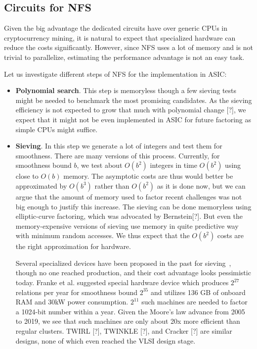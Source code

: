 \documentclass[a4paper]{article}
\begin{document}
 \subsection{Circuits for NFS}
 
 Given the big advantage the dedicated circuits have over generic CPUs in cryptocurrency mining, it is natural to expect that specialized hardware can reduce the costs significantly. However, since NFS uses a lot of memory and is not trivial to parallelize, estimating the performance advantage is not an easy task.
 
 Let us investigate different steps of NFS for the implementation in ASIC:
 \begin{itemize}
    \item \textbf{Polynomial search}.  This step is memoryless though a few sieving tests might be needed to benchmark the most promising candidates. As the sieving efficiency is not expected to grow that much with polynomial change [?], we expect that it might not be even implemented in ASIC for future factoring as simple CPUs might suffice.
 
     \item \textbf{Sieving}. In this step we generate a lot of integers and test them for smoothness.  There are many versions of this process. Currently, for smoothness bound $b$, we test about $O(b^2)$ integers in time $O(b^2)$ using close to $O(b)$ memory. The asymptotic costs are thus would better be approximated by $O(b^3)$ rather than $O(b^2)$ as it is done now, but we can argue that the amount of memory used to factor recent challenges was not big enough to justify this increase. The sieving  can be done memoryless using elliptic-curve factoring, which was advocated by Bernstein[?]. But even
     the memory-expensive versions of sieving use memory in quite predictive way with minimum random accesses. We thus expect that the $O(b^2)$ costs are the right approximation for hardware.
     
     Several specialized devices have been proposed in the past for sieving~\cite{pelzl2005area,bachimanchi2007fpga,izu2007cairn}, though no one reached production, and their cost advantage looks pessimistic today. Franke et al. suggested \cite{DBLP:conf/ches/FrankeKPPPS05} special hardware device which produces $2^{27}$ relations per year for smoothness bound $2^{35}$ and utilizes 136 GB of onboard RAM and 30kW power consumption. $2^{11}$ such machines are needed to factor a 1024-bit number within a year. Given the Moore's law advance from 2005 to 2019, we see that such machines are only about 20x more efficient than regular clusters. TWIRL [?], TWINKLE [?], and Cracker [?] are similar designs, none of which even reached the VLSI design stage.
     

\end{itemize}
\end{document}
